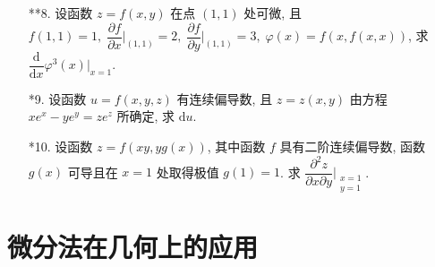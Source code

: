 \begin{enumerate}
    \item[**8.] 设函数 $z=f(x, y)$ 在点 $(1, 1)$ 处可微, 且 $f(1, 1)=1,\;\dfrac{\partial f}{\partial x}\bigg|_{(1, 1)}=2,\;\dfrac{\partial f}{\partial y}\bigg|_{(1, 1)}=3,\;\varphi(x)=f(x, f(x,x))$, 求 $\dfrac{\text{d}}{\text{d}x}\varphi^3(x)\bigg|_{x=1}$.
    
    \item[*9.] 设函数 $u=f(x, y, z)$ 有连续偏导数, 且 $z=z(x, y)$ 由方程 $xe^x-ye^y=ze^z$ 所确定, 求 $\text{d}u$.
     
    \item[*10.] 设函数 $z=f(xy, yg(x))$, 其中函数 $f$ 具有二阶连续偏导数, 函数 $g(x)$ 可导且在 $x=1$ 处取得极值 $g(1)=1$. 求 $\dfrac{\partial^2z}{\partial x\partial y}\bigg|_{\substack{x=1\\y=1}}$.  
\end{enumerate}

\section{微分法在几何上的应用}


